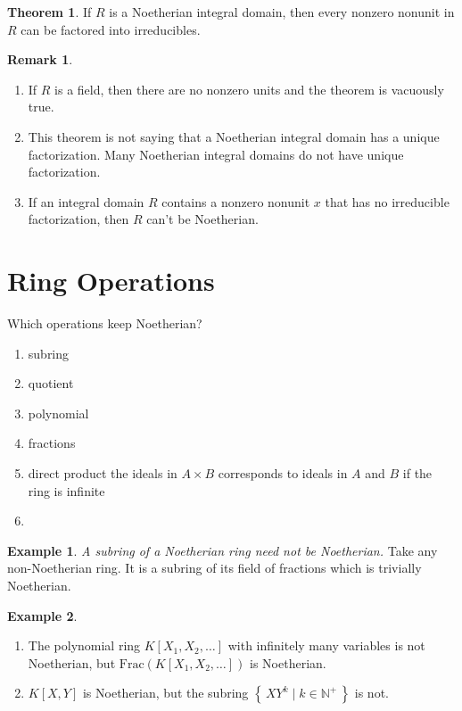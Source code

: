 \documentclass[a4paper]{book}
\theoremstyle{definition}
\newtheorem{example}{Example}[definition]
\newtheorem{theorem}[definition]{Theorem}
\newtheorem*{remark}{Remark}
\newcommand{\makeset}[2]{\left\{\, #1 \mid #2 \,\right\}}
\begin{document}
\begin{thmbox}
    \begin{theorem}
        If \(R\) is a Noetherian integral domain, then every nonzero nonunit in \(R\) can be factored into irreducibles.
    \end{theorem}
\end{thmbox}
\begin{rembox}
    \begin{remark}
        \begin{enumerate}
            \item If \(R\) is a field, then there are no nonzero units and the theorem is vacuously true.
            \item This theorem is not saying that a Noetherian integral domain has a unique factorization. Many Noetherian integral domains do not have unique factorization.
            \item If an integral domain \(R\) contains a nonzero nonunit \(x\) that has no irreducible factorization, then \(R\) can't be Noetherian.
        \end{enumerate}
    \end{remark}
\end{rembox}








\newpage
\section{Ring Operations}
Which operations keep Noetherian?
\begin{enumerate}
    \item subring
    \item quotient
    \item polynomial
    \item fractions
    \item direct product
    the ideals in \(A \times B\) corresponds to ideals in \(A\) and \(B\) if the ring is infinite
    \item 
\end{enumerate}


\begin{exmbox}
    \begin{example}
        \textit{A subring of a Noetherian ring need not be Noetherian.} Take any non-Noetherian ring. It is a subring of its field of fractions which is trivially Noetherian.
    \end{example}
\end{exmbox}
\begin{example}
    \begin{enumerate}
        \item The polynomial ring \(K[X_1, X_2, \ldots]\) with infinitely many variables is not Noetherian, but \(\text{Frac}(K[X_1, X_2, \ldots])\) is Noetherian.
        \item \(K[X, Y]\) is Noetherian, but the subring \(\makeset{XY^k}{k \in \mathbb{N}^+}\) is not.
    \end{enumerate}
\end{example}
\end{document}
